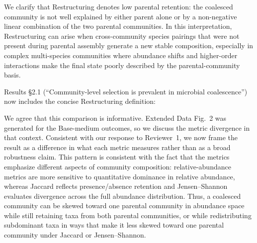 
We clarify that Restructuring denotes low parental retention: the coalesced community is not well explained by either parent alone or by a non-negative linear combination of the two parental communities. In this interpretation, Restructuring can arise when cross-community species pairings that were not present during parental assembly generate a new stable composition, especially in complex multi-species communities where abundance shifts and higher-order interactions make the final state poorly described by the parental-community basis.

Results \S2.1 (``Community-level selection is prevalent in microbial coalescence'') now includes the concise Restructuring definition: 


We agree that this comparison is informative. Extended Data Fig.~2 was generated for the Base-medium outcomes, so we discuss the metric divergence in that context. Consistent with our response to Reviewer~1, we now frame the result as a difference in what each metric measures rather than as a broad robustness claim. This pattern is consistent with the fact that the metrics emphasize different aspects of community composition: relative-abundance metrics are more sensitive to quantitative dominance in relative abundance, whereas Jaccard reflects presence/absence retention and Jensen--Shannon evaluates divergence across the full abundance distribution. Thus, a coalesced community can be skewed toward one parental community in abundance space while still retaining taxa from both parental communities, or while redistributing subdominant taxa in ways that make it less skewed toward one parental community under Jaccard or Jensen--Shannon.

